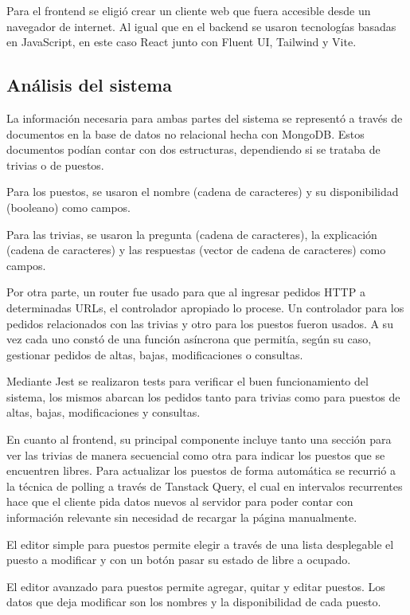 \documentclass{article}
\begin{document}
Para el frontend se eligió crear un cliente web que fuera accesible desde un navegador de internet. Al igual que en el backend se usaron tecnologías basadas en JavaScript, en este caso React junto con Fluent UI, Tailwind y Vite.
\newpage
\subsection{Análisis del sistema}
La información necesaria para ambas partes del sistema se representó a través de documentos en la base de datos no relacional hecha con MongoDB. Estos documentos podían contar con dos estructuras, dependiendo si se trataba de trivias o de puestos.

Para los puestos, se usaron el nombre (cadena de caracteres) y su disponibilidad (booleano) como campos.

Para las trivias, se usaron la pregunta (cadena de caracteres), la explicación (cadena de caracteres) y las respuestas (vector de cadena de caracteres) como campos.

Por otra parte, un router fue usado para que al ingresar pedidos HTTP a determinadas URLs, el controlador apropiado lo procese. Un controlador para los pedidos relacionados con las trivias y otro para los puestos fueron usados. A su vez cada uno constó de una función asíncrona que permitía, según su caso, gestionar pedidos de altas, bajas, modificaciones o consultas.

Mediante Jest se realizaron tests para verificar el buen funcionamiento del sistema, los mismos abarcan los pedidos tanto para trivias como para puestos de altas, bajas, modificaciones y consultas.

En cuanto al frontend, su principal componente incluye tanto una sección para ver las trivias de manera secuencial como otra para indicar los puestos que se encuentren libres. Para actualizar los puestos de forma automática se recurrió a la técnica de polling a través de Tanstack Query, el cual en intervalos recurrentes hace que el cliente pida datos nuevos al servidor para poder contar con información relevante sin necesidad de recargar la página manualmente.

El editor simple para puestos permite elegir a través de una lista desplegable el puesto a modificar y con un botón pasar su estado de libre a ocupado.

El editor avanzado para puestos permite agregar, quitar y editar puestos. Los datos que deja modificar son los nombres y la disponibilidad de cada puesto.
\end{document}

